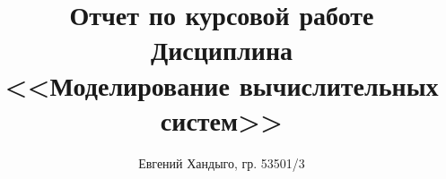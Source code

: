 \documentclass[12pt]{article}
\begin{document}
\title{
    Отчет по курсовой работе \\ 
    Дисциплина \\ <<Моделирование вычислительных систем>>}
\author{Евгений Хандыго, гр. 53501/3}


\tableofcontents
\newpage




\end{document}
